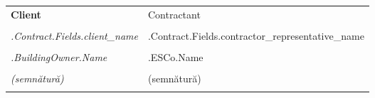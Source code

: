 
\mbox{}\vfill %
\begin{tabu}{X X} \tabucline{}
	\rowfont[c]\bfseries Client & Contractant \\
	[10pt]\makebox[8cm]{\hrulefill} & \makebox[8cm]{\hrulefill} \\
	\rowfont[c]\itshape {{.Contract.Fields.client_name}} & {{.Contract.Fields.contractor_representative_name}} \\
	[10pt]\makebox[8cm]{\hrulefill} & \makebox[8cm]{\hrulefill} \\
	\rowfont[c]\itshape {{.BuildingOwner.Name}} & {{.ESCo.Name}} \\
	[10pt]\makebox[8cm]{\hrulefill} & \makebox[8cm]{\hrulefill} \\
	\rowfont[c]\itshape (semnătură) & (semnătură) \\[4cm] \\
\end{tabu}
\pagebreak
